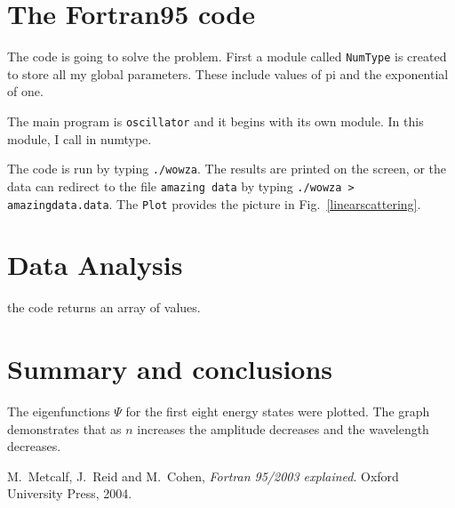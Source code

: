 \documentclass[12pt]{article}
\begin{document}
\section{The Fortran95 code}

The code is going to solve the problem. First a module called {\tt NumType} is created to store all my global parameters. These include values of pi and the exponential of one. 


The main program is {\tt oscillator} and it begins with its own module. In this module, I call in numtype.



The code is run by typing {\tt ./wowza}. The results are printed on the screen, or the data can redirect to the file {\tt amazing data} by typing {\tt ./wowza > amazingdata.data}. The {\tt Plot} provides the picture in Fig.\ \ref{linearscattering}. 

\section{Data Analysis}

the code returns an array of values.

\begin {figure}[!htb]
     \resizebox{\columnwidth}{!}{}
\end {figure}

\section{Summary and conclusions}

The eigenfunctions $\Psi$ for the first eight energy states were plotted. The graph demonstrates that as $n$ increases the amplitude decreases and the wavelength decreases.

\begin{thebibliography}{}


 M.\ Metcalf, J.\ Reid and M.\ Cohen, {\it Fortran 95/2003 explained}. Oxford University Press, 2004.
 

\end{thebibliography}
\end{document}
